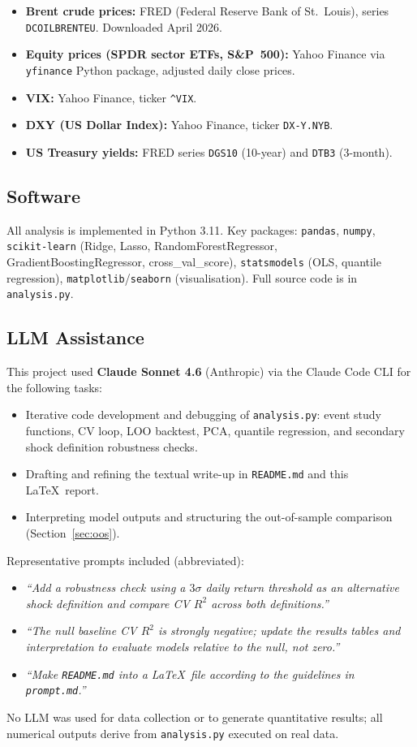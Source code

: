 \documentclass[11pt,a4paper]{article}
\begin{document}
\begin{itemize}[noitemsep]
  \item \textbf{Brent crude prices:} FRED (Federal Reserve Bank of St.\ Louis), series \texttt{DCOILBRENTEU}. Downloaded April 2026.
  \item \textbf{Equity prices (SPDR sector ETFs, S\&P~500):} Yahoo Finance via \texttt{yfinance} Python package, adjusted daily close prices.
  \item \textbf{VIX:} Yahoo Finance, ticker \texttt{\^{}VIX}.
  \item \textbf{DXY (US Dollar Index):} Yahoo Finance, ticker \texttt{DX-Y.NYB}.
  \item \textbf{US Treasury yields:} FRED series \texttt{DGS10} (10-year) and \texttt{DTB3} (3-month).
\end{itemize}

\subsection{Software}

All analysis is implemented in Python 3.11. Key packages: \texttt{pandas}, \texttt{numpy}, \texttt{scikit-learn} (Ridge, Lasso, RandomForestRegressor, GradientBoostingRegressor, cross\_val\_score), \texttt{statsmodels} (OLS, quantile regression), \texttt{matplotlib}/\texttt{seaborn} (visualisation). Full source code is in \texttt{analysis.py}.

\subsection{LLM Assistance}

This project used \textbf{Claude Sonnet 4.6} (Anthropic) via the Claude Code CLI for the following tasks:

\begin{itemize}[noitemsep]
  \item Iterative code development and debugging of \texttt{analysis.py}: event study functions, CV loop, LOO backtest, PCA, quantile regression, and secondary shock definition robustness checks.
  \item Drafting and refining the textual write-up in \texttt{README.md} and this \LaTeX\ report.
  \item Interpreting model outputs and structuring the out-of-sample comparison (Section~\ref{sec:oos}).
\end{itemize}

\noindent Representative prompts included (abbreviated):
\begin{itemize}[noitemsep]
  \item \emph{``Add a robustness check using a $3\sigma$ daily return threshold as an alternative shock definition and compare CV $R^2$ across both definitions.''}
  \item \emph{``The null baseline CV $R^2$ is strongly negative; update the results tables and interpretation to evaluate models relative to the null, not zero.''}
  \item \emph{``Make \texttt{README.md} into a \LaTeX\ file according to the guidelines in \texttt{prompt.md}.''}
\end{itemize}

\noindent No LLM was used for data collection or to generate quantitative results; all numerical outputs derive from \texttt{analysis.py} executed on real data.
\end{document}
